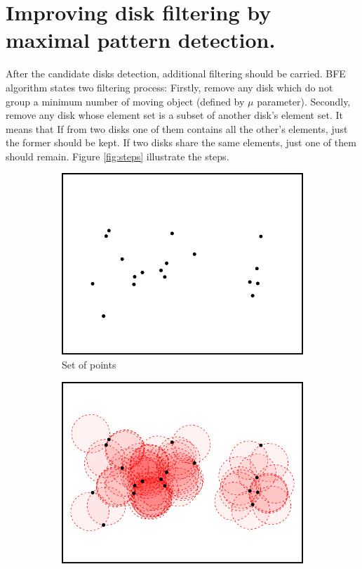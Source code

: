 \documentclass[10pt]{scrartcl}
\begin{document}
\section*{Improving disk filtering by maximal pattern detection.}
After the candidate disks detection, additional filtering should be carried.  BFE algorithm states two filtering process: Firstly, remove any disk which do not group a minimum number of moving object (defined by $\mu$ parameter). Secondly, remove any disk whose element set is a subset of another disk's element set. It means that If from two disks one of them contains all the other's elements, just the former should be kept.  If two disks share the same elements, just one of them should remain.  Figure \ref{fig:steps}  illustrate the steps.

\begin{figure}
  \centering
  \begin{subfigure}[b]{0.475\textwidth}
    \centering
    \includegraphics[width=\textwidth]{../Viz/plot0}
    \caption[]{{\small Set of points}}    
    \label{fig:steps_a}
  \end{subfigure}
  \hfill
  \begin{subfigure}[b]{0.475\textwidth}  
    \centering 
    \includegraphics[width=\textwidth]{../Viz/plot1}

\end{subfigure}
\end{figure}
\end{document}
